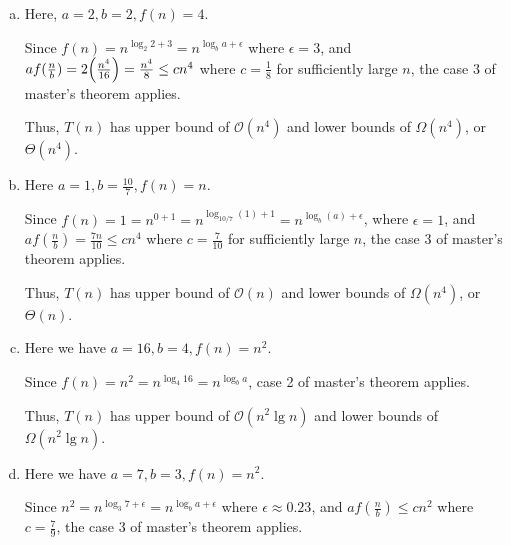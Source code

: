 \documentclass[12pt]{article}
\begin{document}
\begin{enumerate}[1.]
    \begin{enumerate}[a)]
        \item

        Here, $a = 2, b = 2, f(n) = 4$.

        \bigskip

        Since $f(n) = n^{\log_2 2 + 3} = n^{\log_b a + \epsilon}$ where $\epsilon = 3$,
        and $af(\frac{n}{b}) = 2\Bigl( \frac{n^4}{16} \Bigr) = \frac{n^4}{8} \leq cn^4$ where
        $c = \frac{1}{8}$ for sufficiently large $n$, the case 3 of master's theorem applies.

        \bigskip

        Thus, $T(n)$ has upper bound of $\mathcal{O}(n^4)$ and lower bounds of $\Omega(n^4)$, or $\Theta(n^4)$.

        \bigskip

        \item

        Here $a = 1, b = \frac{10}{7}, f(n) = n$.

        \bigskip

        Since $f(n) = 1 = n^{0 + 1} = n^{\log_{10/7} (1) + 1}=n^{\log_b (a) + \epsilon}$, where $\epsilon = 1$,
        and $af(\frac{n}{b}) =\frac{7n}{10} \leq cn^4$ where
        $c = \frac{7}{10}$ for sufficiently large $n$, the case 3 of master's theorem applies.

        \bigskip

        Thus, $T(n)$ has upper bound of $\mathcal{O}(n)$ and lower bounds of $\Omega(n^4)$, or $\Theta(n)$.

        \bigskip

        \item

        Here we have $a = 16, b = 4, f(n) = n^2$.

        \bigskip

        Since $f(n) = n^2 = n^{\log_4 16} = n^{\log_b a}$, case 2 of master's theorem applies.

        \bigskip

        Thus, $T(n)$ has upper bound of $\mathcal{O}(n^2 \lg n)$ and lower bounds of $\Omega(n^2 \lg n)$.

        \bigskip

        \item

        Here we have $a = 7, b = 3, f(n) = n^2$.

        \bigskip

        Since $n^2 = n^{\log_3 7 + \epsilon} = n^{\log_b a + \epsilon}$ where $\epsilon \approx 0.23$,
        and $af(\frac{n}{b}) \leq cn^2$ where $c = \frac{7}{9}$, the case 3 of master's theorem applies.


\end{enumerate}
\end{enumerate}
\end{document}
